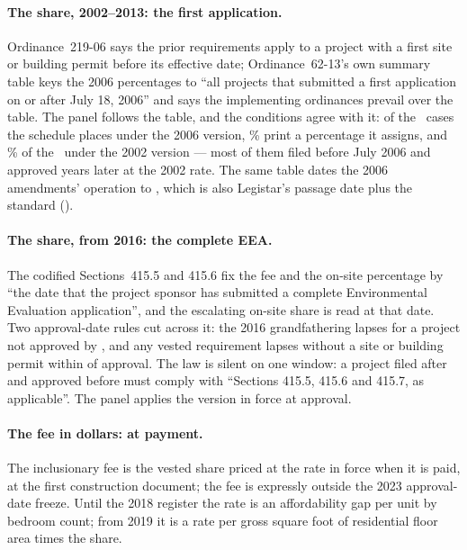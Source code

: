 \documentclass[11pt]{article}
\newcommand{\extable}[1]{\FloatBarrier\def\extab{#1}}
\begin{document}
\extable{exvesting}

\paragraph{The share, 2002--2013: the first application.} Ordinance~219-06 says the prior
requirements apply to a project with a first site or building permit before its effective date;
Ordinance~62-13's own summary table keys the 2006 percentages to ``all projects that submitted
a first application on or after July 18, 2006'' and says the implementing ordinances prevail
over the table. The panel follows the table, and the conditions agree with it: of the
\exCrossSixN\ cases the schedule places under the 2006 version, \exCrossSix\% print a percentage
it assigns, and \exCrossTwo\% of the \exCrossTwoN\ under the 2002 version --- most of them filed
before July 2006 and approved years later at the 2002 rate. The same table dates the 2006
amendments' operation to , which is also Legistar's passage date plus the
standard  (\exEffSixInferred).

\paragraph{The share, from 2016: the complete EEA.} The codified Sections~415.5 and 415.6 fix
the fee and the on-site percentage by ``the date that the project sponsor has submitted a
complete Environmental Evaluation application'', and the escalating on-site share is read at
that date. Two approval-date rules cut across it: the 2016 grandfathering lapses for a project
not approved by , and any vested requirement lapses without a site or
building permit within  of approval. The law is silent on one window: a
project filed after  and approved before  must
comply with ``Sections 415.5, 415.6 and 415.7, as applicable''. The panel applies the version in
force at approval.

\paragraph{The fee in dollars: at payment.} The inclusionary fee is the vested share priced at
the rate in force when it is paid, at the first construction document; the fee is expressly
outside the 2023 approval-date freeze. Until the 2018 register the rate is an affordability gap
per unit by bedroom count; from 2019 it is a rate per gross square foot of residential floor
area times the share.
\end{document}
